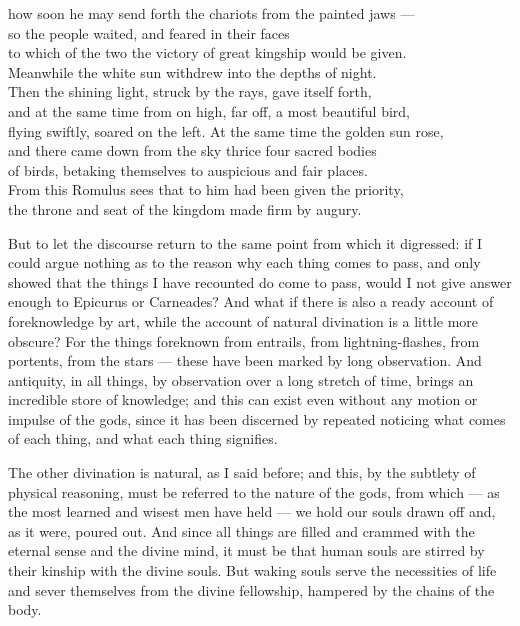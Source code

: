  how soon he may send forth the chariots from the painted jaws — \\
so the people waited, and feared in their faces \\
to which of the two the victory of great kingship would be given. \\
Meanwhile the white sun withdrew into the depths of night. \\
Then the shining light, struck by the rays, gave itself forth, \\
and at the same time from on high, far off, a most beautiful bird, \\
flying swiftly, soared on the left. At the same time the golden sun rose, \\
and there came down from the sky thrice four sacred bodies \\
of birds, betaking themselves to auspicious and fair places. \\
From this Romulus sees that to him had been given the priority, \\
the throne and seat of the kingdom made firm by augury.

 But to let the discourse return to the same point from which it digressed: if I could argue nothing as to the reason why each thing comes to pass, and only showed that the things I have recounted do come to pass, would I not give answer enough to Epicurus or Carneades? And what if there is also a ready account of foreknowledge by art, while the account of natural divination is a little more obscure? For the things foreknown from entrails, from lightning-flashes, from portents, from the stars — these have been marked by long observation. And antiquity, in all things, by observation over a long stretch of time, brings an incredible store of knowledge; and this can exist even without any motion or impulse of the gods, since it has been discerned by repeated noticing what comes of each thing, and what each thing signifies.

 The other divination is natural, as I said before; and this, by the subtlety of physical reasoning, must be referred to the nature of the gods, from which — as the most learned and wisest men have held — we hold our souls drawn off and, as it were, poured out. And since all things are filled and crammed with the eternal sense and the divine mind, it must be that human souls are stirred by their kinship with the divine souls. But waking souls serve the necessities of life and sever themselves from the divine fellowship, hampered by the chains of the body.

